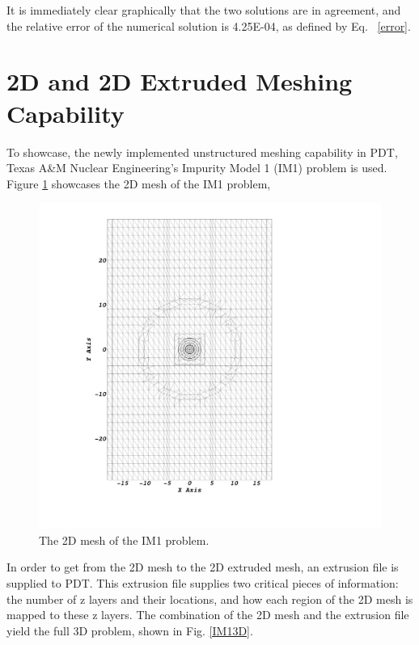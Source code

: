 \documentclass{anstrans}
\begin{document}
It is immediately clear graphically that the two solutions are in agreement, and the relative error of the numerical solution is 4.25E-04, as defined by Eq. ~\eqref{error}.

\section{2D and 2D Extruded Meshing Capability}

To showcase, the newly implemented unstructured meshing capability in PDT, Texas A\&M Nuclear Engineering's Impurity Model 1 (IM1) problem is used. Figure \ref{IM12D} showcases the 2D mesh of the IM1 problem,

\begin{figure}
\centering
\includegraphics[scale = 0.1,trim= 0cm 5cm 0cm 5cm, clip]{figures/im12d.png}
\caption{The 2D mesh of the IM1 problem.}
\label{IM12D}
\end{figure}

In order to get from the 2D mesh to the 2D extruded mesh, an extrusion file is supplied to PDT. This extrusion file supplies two critical pieces of information: the number of z layers and their locations, and how each region of the 2D mesh is mapped to these z layers. The combination of the 2D mesh and the extrusion file yield the full 3D problem, shown in Fig. \ref{IM13D}.
\end{document}
